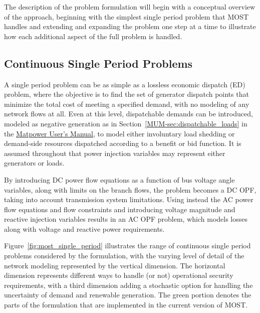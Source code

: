 \documentclass[12pt]{article}
\newcommand{\mpver}[0]{6.1-dev}
\newcommand{\matpower}[0]{{\sc Matpower}}
\newcommand{\most}[0]{{MOST}}
\newcommand{\mumurl}[0]{http://www.pserc.cornell.edu/matpower/docs/MATPOWER-manual-\mpver.pdf}
\newcommand{\mum}[0]{\href{\mumurl}{\matpower{} User's Manual}}
\numberwithin{equation}{section}
\numberwithin{table}{section}
\numberwithin{figure}{section}
\begin{document}
The description of the problem formulation will begin with a conceptual overview of the approach, beginning with the simplest single period problem that \most{} handles and extending and expanding the problem one step at a time to illustrate how each additional aspect of the full problem is handled.

\subsection{Continuous Single Period Problems}

A single period problem can be as simple as a lossless economic dispatch (ED) problem, where the objective is to find the set of generator dispatch points that minimize the total cost of meeting a specified demand, with no modeling of any network flows at all. Even at this level, dispatchable demands can be introduced, modeled as negative generation as in Section~\ref{MUM-sec:dispatchable_loads} in the \mum{}, to model either involuntary load shedding or demand-side resources dispatched according to a benefit or bid function. It is assumed throughout that power injection variables may represent either generators or loads.

By introducing DC power flow equations as a function of bus voltage angle variables, along with limits on the branch flows, the problem becomes a DC OPF, taking into account transmission system limitations. Using instead the AC power flow equations and flow constraints and introducing voltage magnitude and reactive injection variables results in an AC OPF problem, which models losses along with voltage and reactive power requirements.

Figure~\ref{fig:most_single_period} illustrates the range of continuous single period problems considered by the formulation, with the varying level of detail of the network modeling represented by the vertical dimension. The horizontal dimension represents different ways to handle (or not) operational security requirements, with a third dimension adding a stochastic option for handling the uncertainty of demand and renewable generation. The green portion denotes the parts of the formulation that are implemented in the current version of \most{}.
\end{document}
